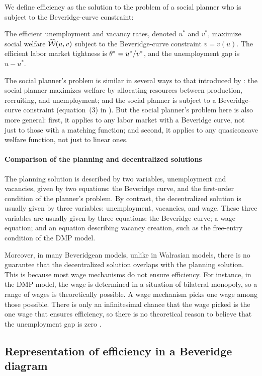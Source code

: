\documentclass[letterpaper,12pt,leqno]{article}
\def\W{\wh{\Wc}}
\begin{document}
We define efficiency as the solution to the problem of a social planner who is subject to the Beveridge-curve constraint:

\begin{definition} The efficient unemployment and vacancy rates, denoted $u^*$ and $v^*$, maximize social welfare $\W(u,v)$ subject to the Beveridge-curve constraint $v=v(u)$. The efficient labor market tightness is $\theta^* = u^* / v^*$, and the unemployment gap is $u-u^*$.\end{definition}

The social planner's problem is similar in several ways to that introduced by : the social planner maximizes welfare by allocating resources between production, recruiting, and unemployment; and the social planner is subject to a Beveridge-curve constraint (equation~(3) in ). But the social planner's problem here is also more general: first, it applies to any labor market with a Beveridge curve, not just to those with a matching function; and second, it applies to any quasiconcave welfare function, not just to linear ones.

\paragraph{Comparison of the planning and decentralized solutions} The planning solution is described by two variables, unemployment and vacancies, given by two equations: the Beveridge curve, and the first-order condition of the planner's problem. By contrast, the decentralized solution is usually given by three variables: unemployment, vacancies, and wage. These three variables are usually given by three equations: the Beveridge curve; a wage equation; and an equation describing vacancy creation, such as the free-entry condition of the DMP model. 

Moreover, in many Beveridgean models, unlike in Walrasian models, there is no guarantee that the decentralized solution overlaps with the planning solution. This is because most wage mechanisms do not ensure efficiency. For instance, in the DMP model, the wage is determined in a situation of bilateral monopoly, so a range of wages is theoretically possible. A wage mechanism picks one wage among those possible. There is only an infinitesimal chance that the wage picked is the one wage that ensures efficiency, so there is no theoretical reason to believe that the unemployment gap is zero .

\subsection{Representation of efficiency in a Beveridge diagram}
\end{document}
